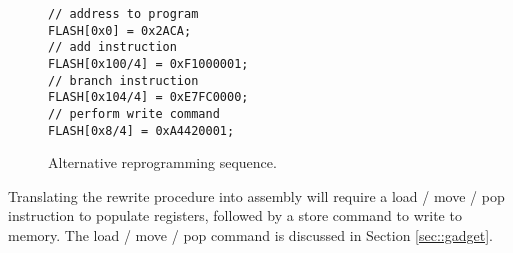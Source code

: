 	\begin{figure}[htbp]
		\begin{lstlisting}
// address to program
FLASH[0x0] = 0x2ACA; 
// add instruction
FLASH[0x100/4] = 0xF1000001;
// branch instruction
FLASH[0x104/4] = 0xE7FC0000;
// perform write command
FLASH[0x8/4] = 0xA4420001; 
		\end{lstlisting}
		\caption{Alternative reprogramming sequence. }\label{fig::alt_prog}
	\end{figure}

Translating the rewrite procedure into assembly will require a load / move / pop instruction to populate registers, followed by a store command to write to memory. The load / move / pop command is discussed in Section \ref{sec::gadget}. 


